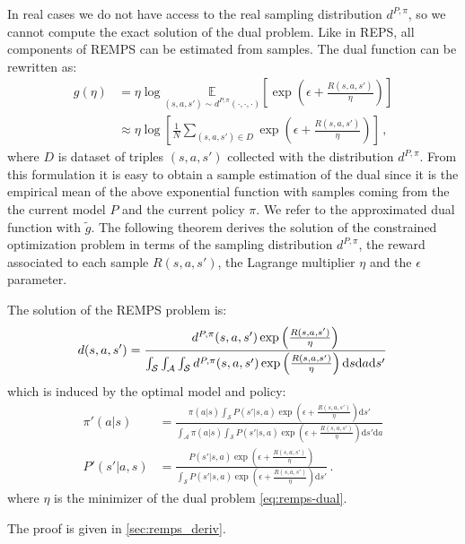 In real cases we do not have access to the real sampling distribution $d^{P,\pi}$, so we cannot compute the exact solution of the dual problem. Like in REPS, all components of REMPS can be estimated from samples. 
The dual function can be rewritten as:
\begin{align}
	g(\eta) &= \eta \log \underset{(s,a,s') \sim d^{P,\pi}(\cdot, \cdot, \cdot)}{\mathbb{E}} \left[\exp \left( \epsilon + \frac{R(s,a,s')}{\eta} \right) \right] \\
	& \approx \eta \log \left[ \frac{1}{N}\sum_{(s,a,s') \in D} \exp \left( \epsilon + \frac{R(s,a,s')}{\eta} \right) \right] \, ,
	\label{eq:dual-sample}
\end{align} 
where $D$ is dataset of triples $(s,a,s')$ collected with the distribution $d^{P,\pi}$.
From this formulation it is easy to obtain a sample estimation of the dual since it is the empirical mean of the above exponential function with samples coming from the the current model $P$ and the current policy $\pi$. We refer to the approximated dual function with $\widetilde{g}$.
\newline
The following theorem derives the solution of the constrained optimization problem in terms of the sampling distribution $d^{P,\pi}$, the reward associated to each sample $R(s,a,s')$, the Lagrange multiplier $\eta$ and the $\epsilon$ parameter.
\begin{theorem}
The solution of the REMPS problem is:
\begin{equation}
	d(s,a,s') = \frac{d^{P,\pi}(s,a,s') \exp \left(\frac{R(s,a,s')}{\eta} \right)}{\int_\mathcal{S} \int_\mathcal{A} \int_\mathcal{S} d^{P,\pi}(s,a,s') \exp \left( \frac{R(s,a,s')}{\eta} \right) \mathrm{d}s \mathrm{d}a \mathrm{d}s' } \,
\end{equation}
which is induced by the optimal model and policy:
\begin{align}
	\pi'(a | s) &= \frac{\pi(a | s) \int_\mathcal{S} P(s' | s,a) \exp \left( \epsilon + \frac{R(s,a,s')}{\eta} \right) \mathrm{d}s'}{\int_\mathcal{A} \pi(a | s) \int_\mathcal{S} P(s' | s,a) \exp \left( \epsilon + \frac{R(s,a,s')}{\eta} \right) \mathrm{d}s' \mathrm{d}a} \\
	P'(s' | a, s) & = \frac{P(s' | s,a) \exp \left( \epsilon + \frac{R(s,a,s')}{\eta} \right)}{\int_\mathcal{S} P(s' | s,a) \exp \left( \epsilon + \frac{R(s,a,s')}{\eta} \right) \mathrm{d}s'}  \, .
\end{align}
where $\eta$ is the minimizer of the dual problem \ref{eq:remps-dual}.
\end{theorem}
The proof is given in \cref{sec:remps_deriv}.

